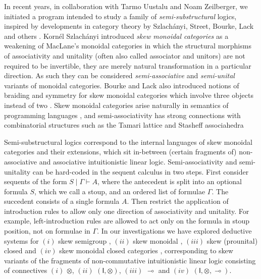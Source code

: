 \documentclass[submission,copyright,creativecommons]{eptcs}
\theoremstyle{definition}
\newcommand{\lolli}{\multimap}
\newcommand{\I}{\mathsf{I}}
\begin{document}
In recent years, in collaboration with Tarmo Uustalu and Noam Zeilberger, we initiated a program intended to study a family of \emph{semi-substructural} logics, inspired by developments in category theory by Szlach{\'a}nyi, Street, Bourke, Lack and others \cite{szlachanyi:skew-monoidal:2012,lack:skew:2012,street:skew-closed:2013,lack:triangulations:2014,buckley:catalan:2015,bourke:skew:2017,bourke:skew:2018,bourke:lack:braided:2020}. Korn{\'e}l Szlach\'anyi introduced \emph{skew monoidal categories} as a weakening of MacLane's monoidal categories in which the structural morphisms of associativity and unitality (often also called associator and unitors) are not required to be invertible, they are merely natural transformation in a particular direction. As such they can be considered \emph{semi-associative} and \emph{semi-unital} variants of monoidal categories. Bourke and Lack also introduced notions of braiding and symmetry for skew monoidal categories which involve three objects instead of two \cite{bourke:lack:braided:2020}. Skew monoidal categories arise naturally in semantics of programming languages \cite{altenkirch:monads:2014}, and semi-associativity has strong connections with combinatorial structures such as the Tamari lattice and Stasheff associahedra \cite{zeilberger:semiassociative:19,moortgat:tamari:20}

Semi-substructural logics correspond to the internal languages of skew monoidal categories and their extensions, which sit in-between (certain fragments of) non-associative and associative intuitionistic linear logic. Semi-associativity and semi-unitality can be hard-coded in the sequent calculus in two steps. First consider sequents of the form $S \mid \Gamma \vdash A$, where the antecedent is split into an optional formula $S$, which we call a stoup, and an ordered list of formulae $\Gamma$. The succedent consists of a single formula $A$. Then restrict the application of introduction rules to allow only one direction of associativity and unitality. For example, left-introduction rules are allowed to act only on the formula in stoup position, not on formulae in $\Gamma$. In our investigations we have explored deductive systems for $(i)$ skew semigroup \cite{zeilberger:semiassociative:19}, $(ii)$ skew monoidal \cite{uustalu:sequent:2021}, $(iii)$ skew (prounital) closed \cite{uustalu:deductive:nodate} and $(iv)$ skew monoidal closed categories \cite{UVW:protsn}, corresponding to skew variants of the fragments of non-commutative intuitionistic linear logic consisting of connectives $(i)$ $\otimes$, $(ii)$ $(\I,\otimes)$, $(iii)$ $\lolli$ and $(iv)$ $(\I,\otimes,\lolli)$.
\end{document}
